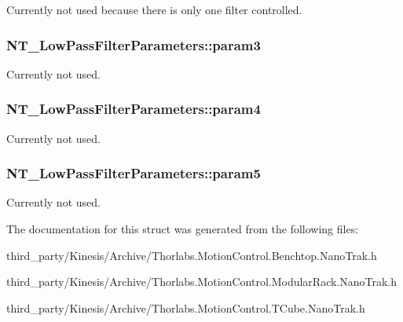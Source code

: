 Currently not used because there is only one filter controlled. 

\subsubsection[{\texorpdfstring{param3}{param3}}]{ N\+T\+\_\+\+Low\+Pass\+Filter\+Parameters\+::param3}\hypertarget{struct_n_t___low_pass_filter_parameters_a3ad4161a85bf1e0c62b4022740918ee6}{}\label{struct_n_t___low_pass_filter_parameters_a3ad4161a85bf1e0c62b4022740918ee6}


Currently not used. 

\subsubsection[{\texorpdfstring{param4}{param4}}]{ N\+T\+\_\+\+Low\+Pass\+Filter\+Parameters\+::param4}\hypertarget{struct_n_t___low_pass_filter_parameters_a4c86757a3acfd21449ff66a7f8c95460}{}\label{struct_n_t___low_pass_filter_parameters_a4c86757a3acfd21449ff66a7f8c95460}


Currently not used. 

\subsubsection[{\texorpdfstring{param5}{param5}}]{ N\+T\+\_\+\+Low\+Pass\+Filter\+Parameters\+::param5}\hypertarget{struct_n_t___low_pass_filter_parameters_ae1f5409f3feb2130f60e0d44ed61c551}{}\label{struct_n_t___low_pass_filter_parameters_ae1f5409f3feb2130f60e0d44ed61c551}


Currently not used. 



The documentation for this struct was generated from the following files\+:\begin{DoxyCompactItemize}
\item 
third\+\_\+party/\+Kinesis/\+Archive/Thorlabs.\+Motion\+Control.\+Benchtop.\+Nano\+Trak.\+h\item 
third\+\_\+party/\+Kinesis/\+Archive/Thorlabs.\+Motion\+Control.\+Modular\+Rack.\+Nano\+Trak.\+h\item 
third\+\_\+party/\+Kinesis/\+Archive/Thorlabs.\+Motion\+Control.\+T\+Cube.\+Nano\+Trak.\+h\end{DoxyCompactItemize}
